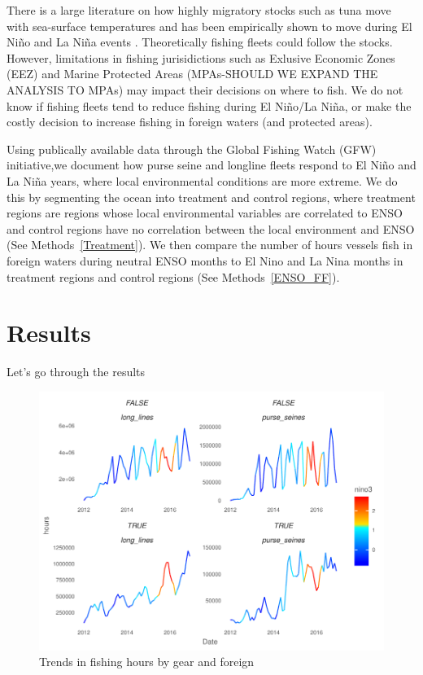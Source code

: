 \documentclass[11pt]{article}
\begin{document}
There is a large literature on how highly migratory stocks such as tuna move with sea-surface temperatures \cite{aqorau:2018} and has been empirically shown to move during El Ni\~{n}o and La Ni\~{n}a events \cite{lehodey:1997}. Theoretically fishing fleets could follow the stocks. However, limitations in fishing jurisidictions such as Exlusive Economic Zones (EEZ) and Marine Protected Areas (MPAs-SHOULD WE EXPAND THE ANALYSIS TO MPAs) may impact their decisions on where to fish. We do not know if fishing fleets tend to reduce fishing during El Ni\~{n}o/La Ni\~{n}a, or make the costly decision to increase fishing in foreign waters (and protected areas). 

Using publically available data through the Global Fishing Watch (GFW) initiative,we document how purse seine and longline fleets respond to El Ni\~{n}o and La Ni\~{n}a years, where local environmental conditions are more extreme. We do this by segmenting the ocean into treatment and control regions, where treatment regions are regions whose local environmental variables are correlated to ENSO and control regions have no correlation between the local environment and ENSO (See Methods~\ref{Treatment}). We then compare the number of hours vessels fish in foreign waters during neutral ENSO months to El Nino and La Nina months in treatment regions and control regions (See Methods~\ref{ENSO_FF}).  

\clearpage

\section{Results}
Let's go through the results

\begin{figure}
\centering
\includegraphics{img/trends_by_gear.pdf}
\caption{Trends in fishing hours by gear and foreign}
\end{figure}
\end{document}
